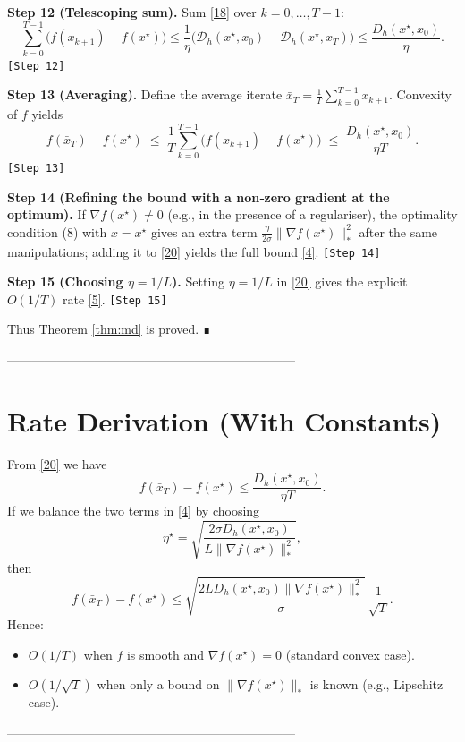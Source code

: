 \documentclass{article}
\newcommand{\D}{\mathcal{D}}
\begin{document}
\noindent\textbf{Step 12 (Telescoping sum).}  
Sum \eqref{18} over $k=0,\dots,T-1$:
\[
\sum_{k=0}^{T-1}\bigl(f(x_{k+1})-f(x^{\star})\bigr)
\le
\frac{1}{\eta}
\Big(
\D_{h}(x^{\star},x_{0})-\D_{h}(x^{\star},x_{T})
\Big)
\le
\frac{D_{h}(x^{\star},x_{0})}{\eta}. \tag{19}
\]
\texttt{[Step 12]}

\noindent\textbf{Step 13 (Averaging).}  
Define the average iterate $\bar{x}_{T}= \frac1T\sum_{k=0}^{T-1}x_{k+1}$.
Convexity of $f$ yields
\[
f(\bar{x}_{T})-f(x^{\star})
\;\le\;
\frac{1}{T}\sum_{k=0}^{T-1}\bigl(f(x_{k+1})-f(x^{\star})\bigr)
\;\le\;
\frac{D_{h}(x^{\star},x_{0})}{\eta T}.
\tag{20}
\]
\texttt{[Step 13]}

\noindent\textbf{Step 14 (Refining the bound with a non‑zero gradient at the optimum).}  
If $\nabla f(x^{\star})\neq 0$ (e.g., in the presence of a regulariser),
the optimality condition (8) with $x=x^{\star}$ gives an extra term
$\frac{\eta}{2\sigma}\|\nabla f(x^{\star})\|_{*}^{2}$ after the same
manipulations; adding it to \eqref{20} yields the full bound \eqref{4}.
\texttt{[Step 14]}

\noindent\textbf{Step 15 (Choosing $\eta=1/L$).}  
Setting $\eta=1/L$ in \eqref{20} gives the explicit $O(1/T)$ rate \eqref{5}.
\texttt{[Step 15]}

Thus Theorem \ref{thm:md} is proved. ∎

---------------------------------------------------------------------

\section*{Rate Derivation (With Constants)}
From \eqref{20} we have
\[
f(\bar{x}_{T})-f(x^{\star})\le
\frac{D_{h}(x^{\star},x_{0})}{\eta T}.
\]
If we balance the two terms in \eqref{4} by choosing
\[
\eta^{\star}
=
\sqrt{\frac{2\sigma D_{h}(x^{\star},x_{0})}
{L\|\nabla f(x^{\star})\|_{*}^{2}}},
\]
then
\[
f(\bar{x}_{T})-f(x^{\star})
\le
\sqrt{\frac{2L D_{h}(x^{\star},x_{0})\|\nabla f(x^{\star})\|_{*}^{2}}{\sigma}}\,
\frac{1}{\sqrt{T}}.
\]
Hence:
\begin{itemize}
\item $O(1/T)$ when $f$ is smooth and $\nabla f(x^{\star})=0$ (standard convex case).
\item $O(1/\sqrt{T})$ when only a bound on $\|\nabla f(x^{\star})\|_{*}$ is known (e.g., Lipschitz case).
\end{itemize}

---------------------------------------------------------------------
\end{document}
